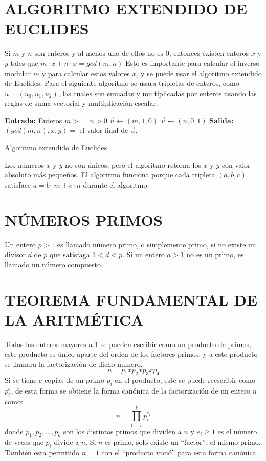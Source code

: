\documentclass[12pt,letterpaper]{book}
\begin{document}
    \section{ALGORITMO EXTENDIDO DE EUCLIDES}
    Si $m$ y $n$ son enteros y al menos uno de ellos no es $0$, entonces existen enteros $x$ y $y$ tales que $m\cdot x + n\cdot x = gcd(m, n)$
    Esto es importante para calcular el inverso modular $m$ y para calcular estos valores $x$, y se puede usar el algoritmo extendido de Euclides.
    Para el siguiente algoritmo se usara tripletas de enteros, como $u = (u_{0}, u_{1}, u_{2})$, las cuales son sumadas y multiplicadas por enteros usando las reglas de suma vectorial y multiplicación escalar.

    \begin{algorithm}[H]
        \SetAlgoLined
        \textbf{Entrada:} Enteros $m >= n > 0$ \;
        $\vec{u} \leftarrow (m,1,0)$\;
        $\vec{v} \leftarrow (n,0,1)$\;
         \textbf{Salida:} $(gcd(m,n),x,y)=$ el valor final de $\vec{u}$.\ 
         \caption{Algoritmo extendido de Euclides}
    \end{algorithm}

    Los números $x$ y $y$ no son únicos, pero el algoritmo retorna los $x$ y $y$ con valor absoluto más pequeños. El algoritmo funciona porque cada tripleta $(a,b,c)$ satisface $a = b\cdot m + c\cdot n$ durante el algoritmo.

    \section{NÚMEROS PRIMOS}
    Un entero $p > 1$ es llamado número primo, o simplemente primo, si no existe un divisor $d$ de $p$ que satisfaga $1 < d < p$. Si un entero $a > 1$ no es un primo, es llamado un número compuesto.

    \section{TEOREMA FUNDAMENTAL DE LA ARITMÉTICA}
    Todos los enteros mayores a $1$ se pueden escribir como un producto de primos, este producto es único aparte del orden de los factores primos, y a este producto se llamara la factorización de dicho numero.
    \[
        n = p_{1} x p_{2} x p_{3} x p_{4}
    \]
    Si se tiene $e$ copias de un primo $p_{i}$ en el producto, este se puede reescribir como $p_{i}^{e}$, de esta forma se obtiene la forma canónica de la factorización de un entero $n$ como:
    \[
        n = \prod_{i=1}^{k}p_{i}^{e_{i}}
    \]
    donde $p_{1}, p_{2},\dots, p_{k}$ son los distintos primos que dividen a $n$ y $e_{i} \geq 1$ es el número de veces que $p_{i}$ divide a $n$. Si $n$ es primo, solo existe un “factor”, el mismo primo. También esta permitido $n=1$ con el “producto vació” para esta forma canónica.
    
\end{document}
